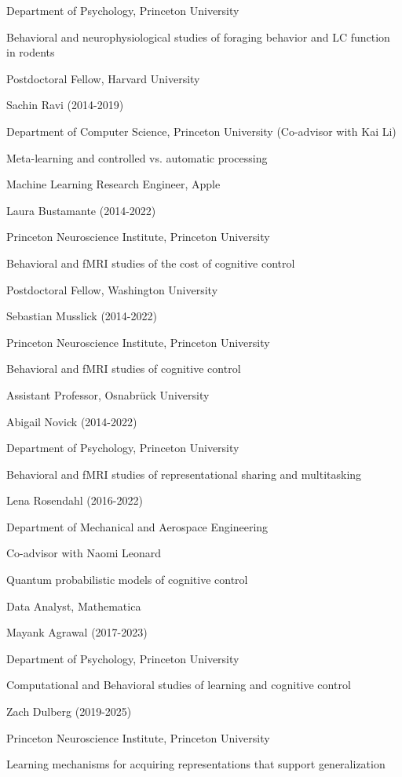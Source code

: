 \documentclass[10 pt]{article}
\begin{document}
Department of Psychology, Princeton University

Behavioral and neurophysiological studies of foraging behavior and LC function in rodents

Postdoctoral Fellow, Harvard University
    \medskip

Sachin Ravi (2014-2019)

Department of Computer Science, Princeton University (Co-advisor with Kai Li)

Meta-learning and controlled vs. automatic processing

Machine Learning Research Engineer, Apple
    \medskip

Laura Bustamante (2014-2022)

Princeton Neuroscience Institute, Princeton University

Behavioral and fMRI studies of the cost of cognitive control

Postdoctoral Fellow, Washington University
    \medskip

Sebastian Musslick (2014-2022)

Princeton Neuroscience Institute, Princeton University

Behavioral and fMRI studies of cognitive control

Assistant Professor, Osnabrück University
    \medskip

Abigail Novick (2014-2022)

Department of Psychology, Princeton University

Behavioral and fMRI studies of representational sharing and multitasking
    \medskip

Lena Rosendahl (2016-2022)

Department of Mechanical and Aerospace Engineering

Co-advisor with Naomi Leonard

Quantum probabilistic models of cognitive control

Data Analyst, Mathematica
    \medskip

Mayank Agrawal (2017-2023)

Department of Psychology, Princeton University

Computational and Behavioral studies of learning and cognitive control
    \medskip

Zach Dulberg (2019-2025)

Princeton Neuroscience Institute, Princeton University

Learning mechanisms for acquiring representations that support generalization
    \medskip
\end{document}

